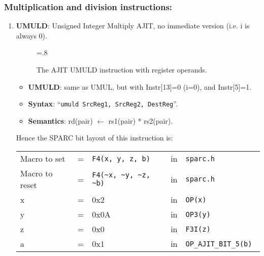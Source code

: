 \subsubsection{Multiplication and division instructions:}
\label{sec:mul:div:insn:impl}
\begin{enumerate}
\item \textbf{UMULD}: Unsigned Integer Multiply AJIT, no immediate
  version (i.e. i is always 0).\\

  \begin{center}
    \begin{figure}[h]
      \centering
      \epsfxsize=.8\linewidth
      \caption{The AJIT UMULD instruction  with register operands.}
      \label{fig:ajit:umuld:insn}
    \end{figure}
  \end{center}
  \begin{itemize}
  \item []\textbf{UMULD}: same as UMUL, but with Instr[13]=0 (i=0), and
    Instr[5]=1.
  \item []\textbf{Syntax}: ``\texttt{umuld  SrcReg1, SrcReg2, DestReg}''.
  \item []\textbf{Semantics}: rd(pair) $\leftarrow$ rs1(pair) * rs2(pair).
  \end{itemize}

  Hence the SPARC bit layout of this instruction is:

  \begin{tabular}[h]{lclcl}
    Macro to set   &=& \verb|F4(x, y, z, b)|     &in& \verb|sparc.h|           \\
    Macro to reset &=& \verb|F4(~x, ~y, ~z, ~b)| &in& \verb|sparc.h|           \\
    x              &=& 0x2                       &in& \verb|OP(x) |            \\
    y              &=& 0x0A                      &in& \verb|OP3(y) |           \\
    z              &=& 0x0                       &in& \verb|F3I(z) |           \\
    a              &=& 0x1                       &in& \verb|OP_AJIT_BIT_5(b) |
  \end{tabular}


\end{enumerate}
